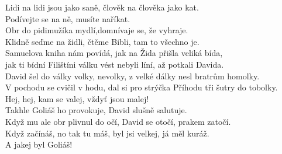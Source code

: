 \nv{}Lidi na lidi jsou jako saně, člověk na člověka jako kat.\\
Podívejte se na ně, musíte naříkat.\\
Obr do pidimužíka mydlí,\sm {}domnívaje se, že vyhraje.\\
Klidně seďme na židli, čtěme Bibli, tam to všechno je.\\
Samuelova kniha nám povídá, jak na Žida přišla veliká bída,\\
jak ti bídní Filištíni válku vést nebyli líní, až potkali Davida.\\
David šel do války volky, nevolky, z velké dálky nesl bratrům homolky.\\
V pochodu se cvičil v hodu, dal si pro strýčka Příhodu tři šutry do tobolky.\\
Hej, hej, kam se valej, vždyť jsou malej!\\
Takhle Goliáš ho provokuje, David slušně salutuje.\\
Když mu ale obr plivnul do očí, David se otočí, prakem zatočí.\\
Když začínáš, no tak tu máš, byl jsi velkej, já měl kuráž.\\
A jakej byl Go\sm{}li\mm{}áš!

\newpage
